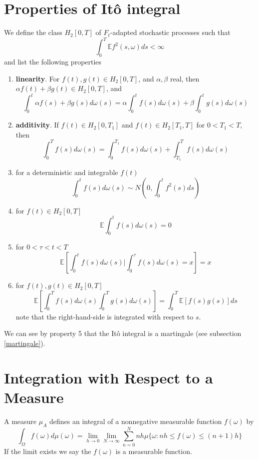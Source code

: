 \documentclass[12pt]{report}
\begin{document}
\section{Properties of It\^{o} integral}\label{propertiesOfTheItoIntegral}
We define the class $H_2[0,T]$ of $F_t$-adapted stochastic processes such that 
\begin{equation*}
\int_0^T \mathbb{E}f^2(s,\omega)ds <\infty
\end{equation*}
and list the following properties
\begin{enumerate}
\item \textbf{linearity}. For $f(t),g(t)\in H_2[0,T]$, and $\alpha,\beta$ real, then $\alpha f(t)+\beta g(t) \in H_2[0,T]$, and 
\begin{equation*}
\int_0^t \alpha f(s)+\beta g(s) d\omega(s) = \alpha \int_0^t f(s)d\omega(s) +\beta \int_0^t g(s)d\omega(s)
\end{equation*}
\item \textbf{additivity}. If $f(t)\in H_2[0,T_1]$ and $f(t)\in H_2[T_1,T]$ for $0<T_1<T$, then 
\begin{equation*}
\int_0^Tf(s)d\omega(s) = \int_0^{T_1}f(s)d\omega(s) +\int_{T_1}^T f(s)d\omega(s)
\end{equation*}
\item for a deterministic and integrable $f(t)$
\begin{equation*}
\int_0^t f(s)d\omega(s) \sim N\left(0,\int_0^t f^2(s)ds\right)
\end{equation*}
\item for $f(t)\in H_2[0,T]$
\begin{equation*}
\mathbb{E}\int_0^t f(s)d\omega(s) = 0
\end{equation*}
\item for $0<\tau<t<T$  
\begin{equation*}
\mathbb{E}\left[\int_0^t f(s)d\omega(s)  | \int_0^\tau f(s)d\omega(s)=x \right] =x 
\end{equation*}
\item for $f(t),g(t)\in H_2[0,T]$
\begin{equation*}
\mathbb{E}\left[\int_0^Tf(s)d\omega(s)\int_0^T g(s)d\omega(s)\right]=\int_0^T\mathbb{E}[f(s)g(s)]ds
\end{equation*}
note that the right-hand-side is integrated with respect to $s$.
\end{enumerate}
We can see by property 5 that the It\^{o} integral is a martingale (see subsection \ref{martingale}).

\section{Integration with Respect to a Measure}
A measure $\mu_A$ defines an integral of a nonnegative measurable function $f(\omega)$ by 
\begin{equation*}
\int_{\Omega}f(\omega)d\mu(\omega)=\lim_{h\rightarrow 0}\lim_{N\rightarrow \infty}\sum_{n=0}^{N}nh\mu\{\omega: nh\leq f(\omega)\leq(n+1)h\}
\end{equation*}
If the limit exists we say the $f(\omega)$ is a measurable function. 
\end{document}
